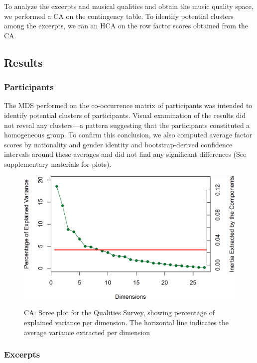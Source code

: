 \documentclass[
  english,
  man]{apa6}
\begin{document}
To analyze the excerpts and musical qualities and obtain the music quality space, we performed a CA on the contingency table. To identify potential clusters among the excerpts, we ran an HCA on the row factor scores obtained from the CA.

\hypertarget{results}{%
\subsection{Results}\label{results}}

\hypertarget{participants-1}{%
\subsubsection{Participants}\label{participants-1}}

The MDS performed on the co-occurrence matrix of participants was intended to identify potential clusters of participants. Visual examination of the results did not reveal any clusters---a pattern suggesting that the participants constituted a homogeneous group. To confirm this conclusion, we also computed average factor scores by nationality and gender identity and bootstrap-derived confidence intervals around these averages and did not find any significant differences (See supplementary materials for plots).

\begin{figure}  
  \begin{center}
  \caption{CA: Scree plot for the Qualities Survey, showing percentage of explained variance per dimension. The horizontal line indicates the average variance extracted per dimension}
    \includegraphics[width=0.6\columnwidth]{./Music-Descriptor-Space_files/figure-latex/scree4excerptsq-1.png}
  \label{fig:scree4excerptsq}  
 \end{center}
\end{figure}

\hypertarget{excerpts}{%
\subsubsection{Excerpts}\label{excerpts}}
\end{document}
